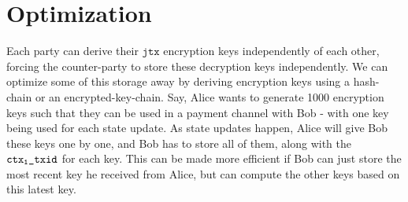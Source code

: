 \section{Optimization}
Each party can derive their $\texttt{jtx}$ encryption keys independently of each other, forcing the counter-party to store these decryption keys independently. We can optimize some of this storage away by deriving encryption keys using a hash-chain or an encrypted-key-chain. Say, Alice wants to generate 1000 encryption keys such that they can be used in a payment channel with Bob - with one key being used for each state update. As state updates happen, Alice will give Bob these keys one by one, and Bob has to store all of them, along with the $\texttt{ctx\textsubscript{1}\_txid}$ for each key. This can be made more efficient if Bob can just store the most recent key he received from Alice, but can compute the other keys based on this latest key. 

